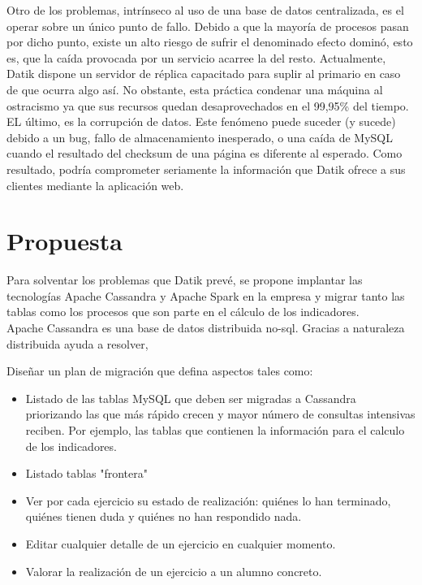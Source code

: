 Otro de los problemas, intrínseco al uso de una base de datos centralizada, es el operar sobre un único punto de fallo. Debido a que la mayoría de procesos pasan por dicho punto, existe un alto riesgo de sufrir el denominado efecto dominó, esto es, que la caída provocada por un servicio acarree la del resto. Actualmente, Datik dispone un servidor de réplica capacitado para suplir al primario en caso de que ocurra algo así. No obstante, esta práctica condenar una máquina al ostracismo ya que sus recursos quedan desaprovechados en el 99,95\% del tiempo.\\

EL último, es la corrupción de datos. Este fenómeno puede suceder (y sucede) debido a un bug, fallo de almacenamiento inesperado, o una caída de MySQL cuando el resultado del checksum de una página es diferente al esperado. Como resultado, podría comprometer seriamente la información que Datik ofrece a sus clientes mediante la aplicación web.\\

\section{Propuesta}

Para solventar los problemas que Datik prevé, se propone implantar las tecnologías Apache Cassandra y Apache Spark en la empresa y migrar tanto las tablas como los procesos que son parte en el cálculo de los indicadores.\\


Apache Cassandra es una base de datos distribuida no-sql. Gracias a naturaleza distribuida ayuda a resolver, 






Diseñar un plan de migración que defina aspectos tales como: 

\begin{itemize}
	\item Listado de las tablas MySQL que deben ser migradas a Cassandra priorizando las que más rápido crecen y mayor número de consultas intensivas reciben. Por ejemplo, las tablas que contienen la información para el calculo de los indicadores.
	\item Listado tablas "frontera"
	\item Ver por cada ejercicio su estado de realización: quiénes lo han terminado, quiénes tienen duda y quiénes no han respondido nada.
	\item Editar cualquier detalle de un ejercicio en cualquier momento.
	\item Valorar la realización de un ejercicio a un alumno concreto.
\end{itemize}

